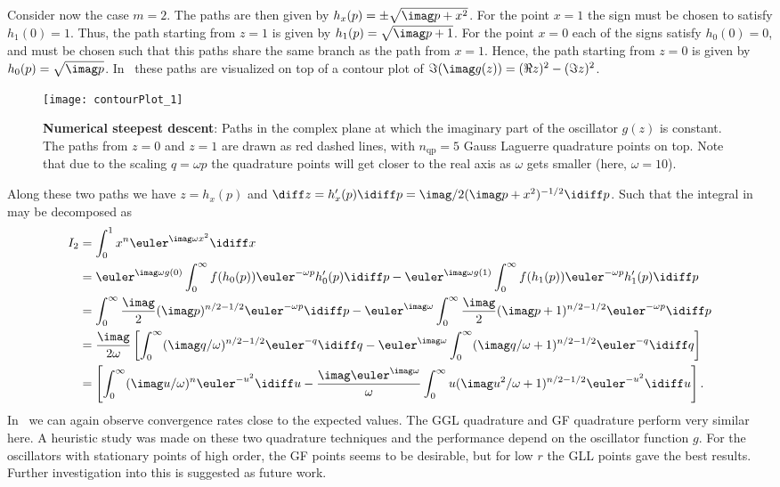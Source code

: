 Consider now the case $m=2$. The paths are then given by $h_x(p) = \pm\sqrt{\imag p + x^2}$. For the point $x=1$ the sign must be chosen to satisfy $h_1(0) = 1$. Thus, the path starting from $z=1$ is given by $h_1(p) = \sqrt{\imag p + 1}$. For the point $x=0$ each of the signs satisfy $h_0(0) = 0$, and must be chosen such that this paths share the same branch as the path from $x=1$. Hence, the path starting from $z=0$ is given by $h_0(p) = \sqrt{\imag p}$. In~ these paths are visualized on top of a contour plot of $\Im(\imag g(z)) = (\Re z)^2-(\Im z)^2$.
\begin{figure}
	\centering
	\texttt{[image: contourPlot\_1]}
	\caption{\textbf{Numerical steepest descent}: Paths in the complex plane at which the imaginary part of the oscillator $g(z)$ is constant. The paths from $z=0$ and $z=1$ are drawn as red dashed lines, with $n_{\mathrm{qp}}=5$ Gauss Laguerre quadrature points on top. Note that due to the scaling $q=\omega p$ the quadrature points will get closer to the real axis as $\omega$ gets smaller (here, $\omega=10$).}
	\label{Fig4:paths}
\end{figure}
Along these two paths we have $z=h_x(p)$ and $\diff z=h_x'(p)\idiff p=\imag/2(\imag p+x^2)^{-1/2}\idiff p$. Such that the integral in~ may be decomposed as
\begin{align*}
	I_2 &= \int_0^1 x^n \euler^{\imag \omega x^2}\idiff x \\
	  &= \euler^{\imag\omega g(0)}\int_0^\infty f(h_0(p))\euler^{-\omega p}h_0'(p)\idiff p - \euler^{\imag\omega g(1)}\int_0^\infty f(h_1(p))\euler^{-\omega p}h_1'(p)\idiff p\\
	  &= \int_0^\infty \frac{\imag}{2}(\imag p)^{n/2-1/2}\euler^{-\omega p}\idiff p - \euler^{\imag\omega}\int_0^\infty \frac{\imag}{2}(\imag p+1)^{n/2-1/2}\euler^{-\omega p}\idiff p\\
	  &= \frac{\imag}{2\omega}\left[\int_0^\infty (\imag q/\omega)^{n/2-1/2}\euler^{-q}\idiff q - \euler^{\imag\omega}\int_0^\infty (\imag q/\omega+1)^{n/2-1/2}\euler^{-q}\idiff q\right]\\
	  &= \left[\int_0^\infty (\imag u/\omega)^n\euler^{-u^2}\idiff u - \frac{\imag\euler^{\imag\omega}}{\omega}\int_0^\infty u(\imag u^2/\omega+1)^{n/2-1/2}\euler^{-u^2}\idiff u\right].
\end{align*}
In~ we can again observe convergence rates close to the expected values. The GGL quadrature and GF quadrature perform very similar here. A heuristic study was made on these two quadrature techniques and the performance depend on the oscillator function $g$. For the oscillators with stationary points of high order, the GF points seems to be desirable, but for low $r$ the GLL points gave the best results. Further investigation into this is suggested as future work.

